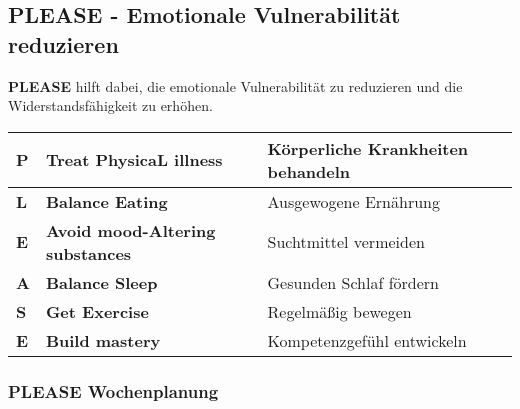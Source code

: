 \subsection{PLEASE - Emotionale Vulnerabilität reduzieren}

\begin{ctmmGreenBox}[title=PLEASE Skills für emotionale Balance]

\textbf{PLEASE} hilft dabei, die emotionale Vulnerabilität zu reduzieren und die Widerstandsfähigkeit zu erhöhen.

\vspace{0.5em}

\begin{tabular}{|l|l|p{7cm}|}
\hline
\textbf{P} & \textbf{Treat PhysicaL illness} & Körperliche Krankheiten behandeln \\
\hline
\textbf{L} & \textbf{Balance Eating} & Ausgewogene Ernährung \\
\hline
\textbf{E} & \textbf{Avoid mood-Altering substances} & Suchtmittel vermeiden \\
\hline
\textbf{A} & \textbf{Balance Sleep} & Gesunden Schlaf fördern \\
\hline
\textbf{S} & \textbf{Get Exercise} & Regelmäßig bewegen \\
\hline
\textbf{E} & \textbf{Build mastery} & Kompetenzgefühl entwickeln \\
\hline
\end{tabular}

\end{ctmmGreenBox}

\subsubsection{PLEASE Wochenplanung}


